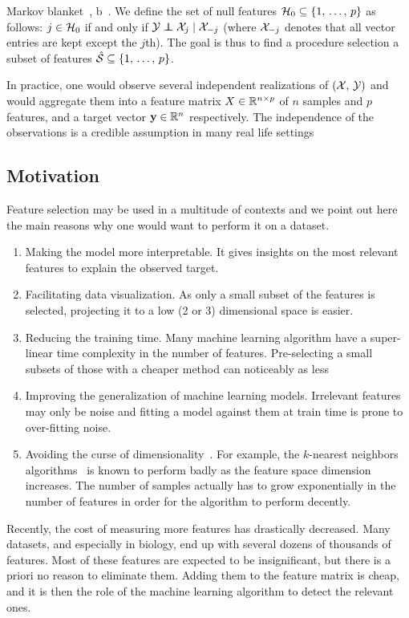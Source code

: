 Markov blanket~\cite{markov_blanket}, b~\cite{markov_blanket_fs}.
We define the set of null features $\mathcal{H}_0 \subseteq \left\{ 1,\, \dots,\, p \right\}$ as follows:
$j \in \mathcal{H}_0$ if and only if $\cY \independent \cX_j \mid \cX_{-j}$
(where $\mathcal{X}_{-j}$ denotes that all vector entries are kept except the $j$th).
The goal is thus to find a procedure selection a subset of features
$\hat{\mathcal{S}} \subseteq \left\{ 1,\, \dots,\, p \right\}$.

In practice, one would observe several independent realizations of
$\left( \mathcal{X},\, \mathcal{Y} \right)$ and would aggregate them into a feature matrix
$X \in \mathbb{R}^{n \times p}$ of $n$ samples and $p$ features, and a target vector $\mathbf{y} \in \mathbb{R}^n$ respectively.
The independence of the observations is a credible assumption in many real life settings

\subsection{Motivation}\label{subsec:fs_motivation}

Feature selection may be used in a multitude of contexts and we point out here the main reasons why
one would want to perform it on a dataset.
\begin{enumerate}
    \item Making the model more interpretable.
    It gives insights on the most relevant features to explain the observed target.
    \item Facilitating data visualization.
    As only a small subset of the features is selected,
    projecting it to a low (2 or 3) dimensional space is easier.
    \item Reducing the training time.
    Many machine learning algorithm have a super-linear time complexity in the number of features.
    Pre-selecting a small subsets of those with a cheaper method can noticeably as less\cite{high_dimensional_fs}
    \item Improving the generalization of machine learning models.
    Irrelevant features may only be noise and fitting a model against them at train time
    is prone to over-fitting noise.
    \item Avoiding the curse of dimensionality~\cite{curse_dimensionality}.
    For example, the $k$-nearest neighbors algorithms~\cite{knn} is known to perform badly as the feature space
    dimension increases.
    The number of samples actually has to grow exponentially in the number of features in order for the algorithm
    to perform decently.
\end{enumerate}
Recently, the cost of measuring more features has drastically decreased.
Many datasets, and especially in biology, end up with several dozens of thousands of features.
Most of these features are expected to be insignificant, but there is a priori no reason to eliminate them.
Adding them to the feature matrix is cheap, and it is then the role of the machine learning algorithm
to detect the relevant ones.

